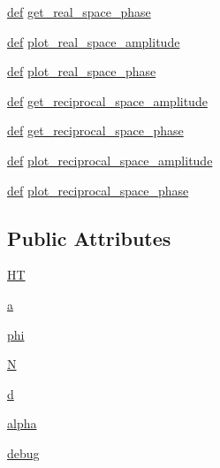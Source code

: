 \begin{DoxyCompactItemize}
\item 
\hyperlink{sim_image_from_wave_8m_a72b6b8e83430abf007f20aeae4dc2f74}{def} \hyperlink{classpython_1_1models_1_1raw__models_1_1probe_1_1probe_ac2cfde01acbe5a96fcafccb0cbf9783c}{get\-\_\-real\-\_\-space\-\_\-phase}
\item 
\hyperlink{sim_image_from_wave_8m_a72b6b8e83430abf007f20aeae4dc2f74}{def} \hyperlink{classpython_1_1models_1_1raw__models_1_1probe_1_1probe_a1e2900053f3fa24f2f986a2a2acd1ba5}{plot\-\_\-real\-\_\-space\-\_\-amplitude}
\item 
\hyperlink{sim_image_from_wave_8m_a72b6b8e83430abf007f20aeae4dc2f74}{def} \hyperlink{classpython_1_1models_1_1raw__models_1_1probe_1_1probe_a2c55734a56b75bc278ba31dc3d7e2feb}{plot\-\_\-real\-\_\-space\-\_\-phase}
\item 
\hyperlink{sim_image_from_wave_8m_a72b6b8e83430abf007f20aeae4dc2f74}{def} \hyperlink{classpython_1_1models_1_1raw__models_1_1probe_1_1probe_a4182c23858863212dfedae253cfcfef1}{get\-\_\-reciprocal\-\_\-space\-\_\-amplitude}
\item 
\hyperlink{sim_image_from_wave_8m_a72b6b8e83430abf007f20aeae4dc2f74}{def} \hyperlink{classpython_1_1models_1_1raw__models_1_1probe_1_1probe_a5b9fae90e440d30e9593b9d5ecba59d8}{get\-\_\-reciprocal\-\_\-space\-\_\-phase}
\item 
\hyperlink{sim_image_from_wave_8m_a72b6b8e83430abf007f20aeae4dc2f74}{def} \hyperlink{classpython_1_1models_1_1raw__models_1_1probe_1_1probe_a88653617ded5957bec36e6d958fd0a91}{plot\-\_\-reciprocal\-\_\-space\-\_\-amplitude}
\item 
\hyperlink{sim_image_from_wave_8m_a72b6b8e83430abf007f20aeae4dc2f74}{def} \hyperlink{classpython_1_1models_1_1raw__models_1_1probe_1_1probe_a3d0f1aba0f30422a234adb02d38f3d60}{plot\-\_\-reciprocal\-\_\-space\-\_\-phase}
\end{DoxyCompactItemize}
\subsection*{Public Attributes}
\begin{DoxyCompactItemize}
\item 
\hyperlink{classpython_1_1models_1_1raw__models_1_1probe_1_1probe_acdb528566f6dd406f1e3fb66509b0d7f}{H\-T}
\item 
\hyperlink{classpython_1_1models_1_1raw__models_1_1probe_1_1probe_a84f132a341ed16d32a294ff833c868be}{a}
\item 
\hyperlink{classpython_1_1models_1_1raw__models_1_1probe_1_1probe_a9cf5e99b1f503ffcec65bde094d88f46}{phi}
\item 
\hyperlink{classpython_1_1models_1_1raw__models_1_1probe_1_1probe_a07568226668642c818ebd898c4051f25}{N}
\item 
\hyperlink{classpython_1_1models_1_1raw__models_1_1probe_1_1probe_aceec6c476ff8f04cf592770ab4ffc265}{d}
\item 
\hyperlink{classpython_1_1models_1_1raw__models_1_1probe_1_1probe_ab2d3ba66e319cb781f0a951059ede4b9}{alpha}
\item 
\hyperlink{classpython_1_1models_1_1raw__models_1_1probe_1_1probe_a1efd16064847655675c89c36ec0da1d3}{debug}
\end{DoxyCompactItemize}
